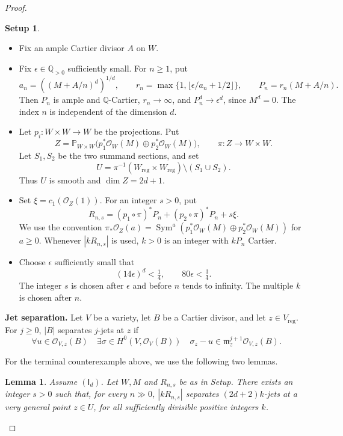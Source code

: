 \documentclass[12pt,a4paper,psamsfonts]{amsart}
\theoremstyle{definition}
\newtheorem*{setup}{Setup}
\theoremstyle{plain}
\newtheorem{lemma}{Lemma}[section]
\newcommand{\Q}{\mathbb Q}
\newcommand{\OO}{\mathcal O}
\newcommand{\PP}{\mathbb P}
\DeclareMathOperator{\Sym}{Sym}
\begin{document}
\begin{proof}
\begin{setup}
\leavevmode
\begin{itemize}
\setlength{\itemsep}{2pt}
\setlength{\parsep}{0pt}
\item Fix an ample Cartier divisor $A$ on $W$.
\item Fix $\epsilon\in\Q_{>0}$ sufficiently small. For $n\ge1$, put
\[
 a_n=((M+A/n)^d)^{1/d},\qquad
 r_n=\max\{1,\lfloor\epsilon/a_n+1/2\rfloor\},\qquad
 P_n=r_n(M+A/n).
\]
Then $P_n$ is ample and $\mathbb{Q}$-Cartier, $r_n\to\infty$, and
$P_n^d\to\epsilon^d$, since $M^d=0$. The index $n$ is independent
of the dimension $d$.
\item Let $p_i:W\times W\to W$ be the projections. Put
\[
 Z=\PP_{W\times W}
       \bigl(p_1^*\OO_W(M)\oplus p_2^*\OO_W(M)\bigr),
 \qquad \pi:Z\to W\times W.
\]
Let $S_1,S_2$ be the two summand sections, and set
\[
 U=\pi^{-1}(W_{\mathrm{reg}}\times W_{\mathrm{reg}})
       \setminus(S_1\cup S_2).
\]
Thus $U$ is smooth and $\dim Z=2d+1$.
\item Set $\xi=c_1(\OO_Z(1))$. For an integer $s>0$, put
\[
 R_{n,s}=(p_1\circ\pi)^*P_n+(p_2\circ\pi)^*P_n+s\xi.
\]
We use the convention
$\pi_*\OO_Z(a)=\Sym^a(p_1^*\OO_W(M)\oplus p_2^*\OO_W(M))$
for $a\ge0$. Whenever $|kR_{n,s}|$ is used, $k>0$ is an integer
with $kP_n$ Cartier.
\item Choose $\epsilon$ sufficiently small that
\[
 (14\epsilon)^d<\tfrac14,\qquad80\epsilon<\tfrac34.
\]
The integer $s$ is chosen after $\epsilon$ and before $n$ tends
to infinity. The multiple $k$ is chosen after $n$.
\end{itemize}
\end{setup}

\medskip
\noindent\textbf{Jet separation.}
Let $V$ be a variety, let $B$ be a Cartier divisor, and let
$z\in V_{\mathrm{reg}}$. For $j\ge0$, $|B|$ separates $j$-jets
at $z$ if
\[
 \forall u\in\OO_{V,z}(B)\quad
 \exists\sigma\in H^0(V,\OO_V(B))\quad
 \sigma_z-u\in\mathfrak m_z^{j+1}\OO_{V,z}(B).
\]

For the terminal counterexample above, we use the following two
lemmas.

\begin{lemma}\label{lem:general-jets}
Assume $(\mathsf I_d)$. Let $W,M$ and $R_{n,s}$ be as in Setup.
There exists an integer $s>0$ such that, for every $n\gg0$,
$|kR_{n,s}|$ separates $(2d+2)k$-jets at a very general point
$z\in U$, for all sufficiently divisible positive integers $k$.
\end{lemma}


\end{proof}
\end{document}
